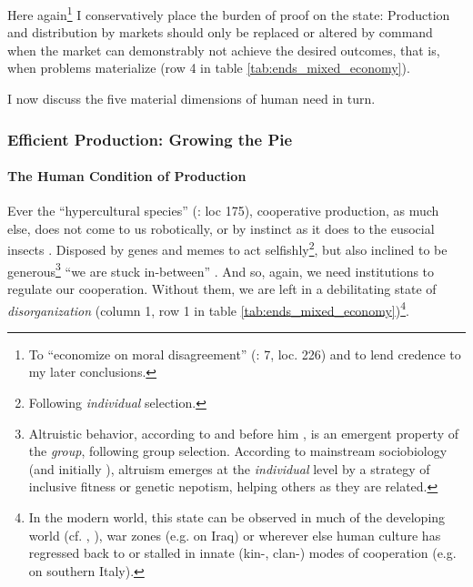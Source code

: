 Here again\footnote
	{To ``economize on moral disagreement'' (\citealt{GutmannThompson-2004-aa}: 7,  loc. 226) and to lend credence to my later conclusions.}
I conservatively place the burden of proof on the state: Production and distribution by markets should only be replaced or altered by command when the market can demonstrably not achieve the desired outcomes, that is, when problems materialize (row 4 in table \ref{tab:ends_mixed_economy}).

I now discuss the five material dimensions of human need in turn. 

\subsubsection[Efficient Production]{Efficient Production: Growing the Pie}\label{sec:production}

\paragraph{The Human Condition of Production} \label{sec:human_condition_of_production}
Ever the ``hypercultural species'' (\citealt{Henrich2007}: loc 175), cooperative production, as much else, does not come to us robotically, or by instinct as it does to the eusocial insects \citep{Wilson2012}. Disposed by genes and memes to act selfishly\footnote
	{Following \emph{individual} selection.}, 
but also inclined to be generous\footnote
	{Altruistic behavior, according to \cite{Wilson2012} and before him \cite{Darwin1859}, is an emergent property of the \emph{group}, following group selection. According to mainstream sociobiology (and initially \citealt{Wilson1975}), altruism emerges at the \emph{individual} level by a strategy of inclusive fitness or genetic nepotism, helping others as they are related.} 
``we are stuck in-between'' \citep{Lehrer2012}. And so, again, we need institutions to regulate our cooperation. Without them, we are left in a debilitating state of \emph{disorganization} (column 1, row 1 in table \ref{tab:ends_mixed_economy})\footnote
	{In the modern world, this state can be observed in much of the developing world (cf. \citealt{Clark2007}, \citealt{Easterly-2006-aa}), war zones (e.g. \citealt{Baker-IIIHamilton-2006-aa} on Iraq) or wherever else human culture has regressed back to or stalled in innate (kin-, clan-) modes of cooperation (e.g. \citealt{PutnamLeonardi-1993-aa} on southern Italy).}.

